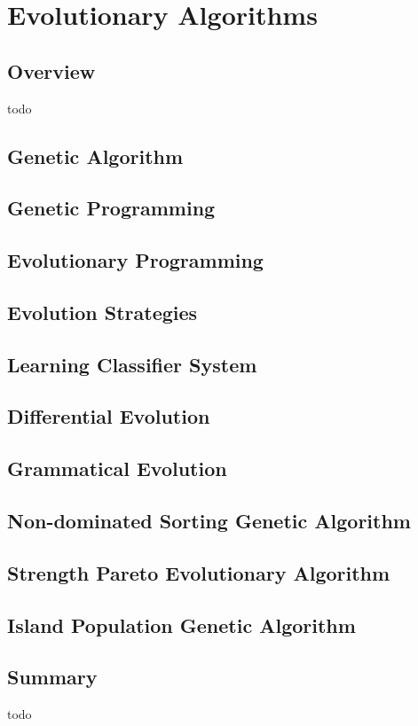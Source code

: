 


\chapter{Evolutionary Algorithms}
\label{ch:evolutionary}

\section{Overview}
todo

\newpage\section{Genetic Algorithm}
\newpage\section{Genetic Programming}
\newpage\section{Evolutionary Programming}
\newpage\section{Evolution Strategies}
\newpage\section{Learning Classifier System}
\newpage\section{Differential Evolution}
\newpage\section{Grammatical Evolution}
\newpage\section{Non-dominated Sorting Genetic Algorithm}
\newpage\section{Strength Pareto Evolutionary Algorithm}
\newpage\section{Island Population Genetic Algorithm}
\newpage

\section{Summary}
todo
